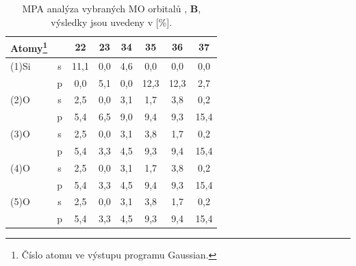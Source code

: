 \documentclass[
digital, %
table,   %
lof,     %
lot,     %
oneside,
]{fithesis3}
\begin{document}
\begin{table}[htbp] \begin{minipage}{\textwidth}
\caption{MPA analýza vybraných MO orbitalů , \textbf{B}, výsledky jsou uvedeny v [\%].}
\begin{center}
\begin{tabular}{|l|c|c|c|c|c|c|c|}
\hline
Atomy\footnote{Číslo atomu ve výstupu programu Gaussian.}\label{si_och3_4_MPA} &  & 22 & 23 & 34 & 35 & 36 & 37 \\ \hline
(1)Si & s  & 11,1  & 0,0  & 4,6  & 0,0  & 0,0  & 0,0  \\ \hline
& p & 0,0  & 5,1  & 0,0  & 12,3  & 12,3  & 2,7  \\ \hline
(2)O& s  & 2,5  & 0,0  & 3,1  & 1,7  & 3,8  & 0,2  \\ \hline
& p & 5,4  & 6,5  & 9,0  & 9,4  & 9,3  & 15,4  \\ \hline
(3)O & s  & 2,5  & 0,0  & 3,1  & 3,8  & 1,7  & 0,2  \\ \hline
& p & 5,4  & 3,3  & 4,5  & 9,3  & 9,4  & 15,4  \\ \hline
(4)O & s  & 2,5  & 0,0  & 3,1  & 1,7  & 3,8  & 0,2  \\ \hline
& p & 5,4  & 3,3  & 4,5  & 9,4  & 9,3  & 15,4  \\ \hline
(5)O & s  & 2,5  & 0,0  & 3,1  & 3,8  & 1,7  & 0,2  \\ \hline
& p & 5,4  & 3,3  & 4,5  & 9,3  & 9,4  & 15,4  \\ \hline
\end{tabular}
\end{center}
\end{minipage}
\end{table}
\end{document}
